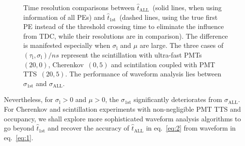 \begin{figure}[H]
  \centering
  \resizebox{0.8\textwidth}{!}{}
  \caption{\label{fig:reso-diff} Time resolution comparisons between $\hat{t}_{\mathrm{ALL}}$~(solid lines, when using information of all PEs) and $\hat{t}_\mathrm{1st}$~(dashed lines, using the true first PE instead of the threshold crossing time to eliminate the influence from TDC, while their resolutions are in comparison).  The difference is manifested especially when $\sigma_\mathrm{l}$ and $\mu$ are large. The three cases of $(\tau_\mathrm{l}, \sigma_\mathrm{l})/\si{ns}$ represent the scintillation with ultra-fast PMTs~$(20, 0)$, Cherenkov~$(0, 5)$ and scintilation coupled with PMT TTS~$(20, 5)$. The performance of waveform analysis lies between $\sigma_{\mathrm{1st}}$ and $\sigma_{\mathrm{ALL}}$. }
\end{figure}

Nevertheless, for $\sigma_\mathrm{l} > 0$ and $\mu >0$, the $\sigma_{\mathrm{1st}}$ significantly deteriorates from $\sigma_{\mathrm{ALL}}$.  For Cherenkov and scintillation experiments with non-negligible PMT TTS and occupancy, we shall explore more sophisticated waveform analysis algorithms to go beyond $\hat{t}_{\mathrm{1st}}$ and recover the accuracy of $\hat{t}_\mathrm{ALL}$ in eq.~\eqref{eq:2} from waveform in eq.~\eqref{eq:1}.
